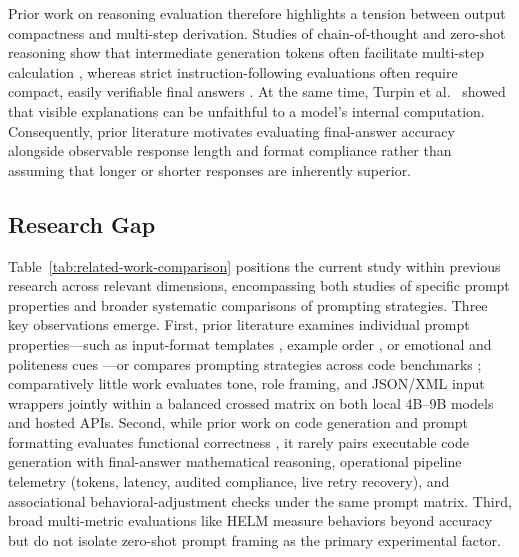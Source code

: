 \documentclass[a4paper,fleqn]{cas-sc}
\begin{document}
Prior work on reasoning evaluation therefore highlights a tension between output compactness and multi-step derivation. Studies of chain-of-thought and zero-shot reasoning show that intermediate generation tokens often facilitate multi-step calculation \citep{wei2022cot, kojima2022zeroshot}, whereas strict instruction-following evaluations often require compact, easily verifiable final answers \citep{zhou2023ifeval}. At the same time, Turpin et al.\ \citep{turpin2023unfaithful} showed that visible explanations can be unfaithful to a model's internal computation. Consequently, prior literature motivates evaluating final-answer accuracy alongside observable response length and format compliance rather than assuming that longer or shorter responses are inherently superior.

\subsection{Research Gap}\label{research-gap}

Table~\ref{tab:related-work-comparison} positions the current study within previous research across relevant dimensions, encompassing both studies of specific prompt properties and broader systematic comparisons of prompting strategies. Three key observations emerge. First, prior literature examines individual prompt properties—such as input-format templates \citep{sclar2023spurious, he2024formatting}, example order \citep{lu2021fantastically}, or emotional and politeness cues \citep{li2023emotionprompt,yin2024politeness}—or compares prompting strategies across code benchmarks \citep{deluca2026evaluating, cheng2026systemprompts, midolo2026guidelines}; comparatively little work evaluates tone, role framing, and JSON/XML input wrappers jointly within a balanced crossed matrix on both local 4B--9B models and hosted APIs. Second, while prior work on code generation and prompt formatting evaluates functional correctness \citep{zhuo2024prosa, he2024formatting, deluca2026evaluating, cheng2026systemprompts}, it rarely pairs executable code generation with final-answer mathematical reasoning, operational pipeline telemetry (tokens, latency, audited compliance, live retry recovery), and associational behavioral-adjustment checks under the same prompt matrix. Third, broad multi-metric evaluations like HELM \citep{liang2023helm} measure behaviors beyond accuracy but do not isolate zero-shot prompt framing as the primary experimental factor.
\end{document}
